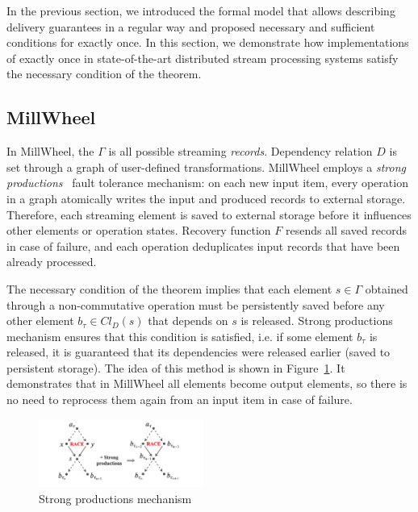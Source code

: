 \label{fs-eo-impl}

In the previous section, we introduced the formal model that allows describing delivery guarantees in a regular way and proposed necessary and sufficient conditions for exactly once. In this section, we demonstrate how implementations of exactly once in state-of-the-art distributed stream processing systems satisfy the necessary condition of the theorem. 

\subsection{MillWheel}

In MillWheel, the $\Gamma$ is all possible streaming {\em records}. Dependency relation $D$ is set through a graph of user-defined transformations. MillWheel employs a {\em strong productions}~\cite{Akidau:2013:MFS:2536222.2536229} fault tolerance mechanism: on each new input item, every operation in a graph atomically writes the input and produced records to external storage. Therefore, each streaming element is saved to external storage before it influences other elements or operation states. Recovery function $F$ resends all saved records in case of failure, and each operation deduplicates input records that have been already processed.

The necessary condition of the theorem implies that each element $s \in \Gamma$ obtained through a non-commutative operation must be persistently saved before any other element $b_{\tau} \in Cl_D(s)$ that depends on $s$ is released. Strong productions mechanism ensures that this condition is satisfied, i.e. if some element $b_\tau$ is released, it is guaranteed that its dependencies were released earlier (saved to persistent storage). The idea of this method is shown in Figure~\ref{millwheel}. It demonstrates that in MillWheel all elements become output elements, so there is no need to reprocess them again from an input item in case of failure. 

\begin{figure}[htbp]
  \centering
  \includegraphics[width=0.48\textwidth]{pics/millwheel}
  \caption{Strong productions mechanism}
  \label {millwheel}
\end{figure}

